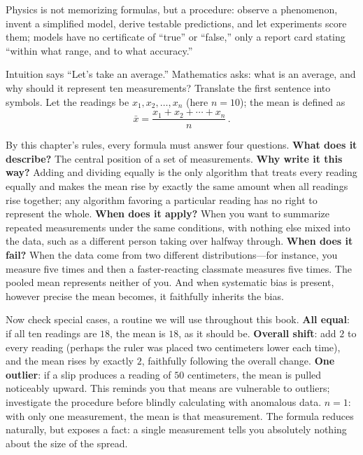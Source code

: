 \begin{oneline}
Physics is not memorizing formulas, but a procedure: observe a phenomenon, invent a simplified model, derive testable predictions, and let experiments score them; models have no certificate of ``true'' or ``false,'' only a report card stating ``within what range, and to what accuracy.''
\end{oneline}


Intuition says ``Let's take an average.'' Mathematics asks: what is an average, and why should it represent ten measurements? Translate the first sentence into symbols. Let the readings be \(x_1, x_2, \ldots, x_n\) (here \(n=10\)); the mean is defined as
\[
\bar{x}=\frac{x_1+x_2+\cdots+x_n}{n}\,.
\]

By this chapter's rules, every formula must answer four questions. \textbf{What does it describe?} The central position of a set of measurements. \textbf{Why write it this way?} Adding and dividing equally is the only algorithm that treats every reading equally and makes the mean rise by exactly the same amount when all readings rise together; any algorithm favoring a particular reading has no right to represent the whole. \textbf{When does it apply?} When you want to summarize repeated measurements under the same conditions, with nothing else mixed into the data, such as a different person taking over halfway through. \textbf{When does it fail?} When the data come from two different distributions---for instance, you measure five times and then a faster-reacting classmate measures five times. The pooled mean represents neither of you. And when systematic bias is present, however precise the mean becomes, it faithfully inherits the bias.

Now check special cases, a routine we will use throughout this book. \textbf{All equal}: if all ten readings are \(18\), the mean is \(18\), as it should be. \textbf{Overall shift}: add \(2\) to every reading (perhaps the ruler was placed two centimeters lower each time), and the mean rises by exactly \(2\), faithfully following the overall change. \textbf{One outlier}: if a slip produces a reading of \(50\) centimeters, the mean is pulled noticeably upward. This reminds you that means are vulnerable to outliers; investigate the procedure before blindly calculating with anomalous data. \textbf{\(n=1\)}: with only one measurement, the mean is that measurement. The formula reduces naturally, but exposes a fact: a single measurement tells you absolutely nothing about the size of the spread.


